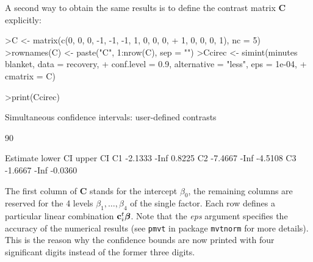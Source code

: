 \documentclass{article}
\newcommand{\bbeta}{\mbox{\boldmath $\beta$}}
\newcommand{\bc}{{\mathbf{c}}}
\newcommand{\bC}{{\mathbf{C}}}
\begin{document}
A second way to obtain the same results is to define the contrast
matrix $\bC$ explicitly:
\small
\begin{Schunk}
\begin{Sinput}
>C <- matrix(c(0, 0, 0, -1, -1, -1, 1, 0, 0, 0, 
+     1, 0, 0, 0, 1), nc = 5)
>rownames(C) <- paste("C", 1:nrow(C), sep = "")
>Ccirec <- simint(minutes ~ blanket, data = recovery, 
+     conf.level = 0.9, alternative = "less", eps = 1e-04, 
+     cmatrix = C)
\end{Sinput}
\end{Schunk}
\begin{Schunk}
\begin{Sinput}
>print(Ccirec)
\end{Sinput}
\begin{Soutput}
	Simultaneous confidence intervals: user-defined
	contrasts

	90 % confidence intervals

   Estimate lower CI upper CI
C1  -2.1333     -Inf   0.8225
C2  -7.4667     -Inf  -4.5108
C3  -1.6667     -Inf  -0.0360
\end{Soutput}
\end{Schunk}
\normalsize
The first column of $\bC$ stands for the intercept $\beta_0$, the
remaining columns are reserved for the 4 levels $\beta_1, \dots,
\beta_4$ of the single factor. Each row defines a particular
linear combination $\bc_i^t \bbeta$. Note that the {\em eps} argument
specifies the accuracy of the numerical results (see \texttt{pmvt} in package
\texttt{mvtnorm} for more details). This is the reason why
the confidence bounds are now printed with four significant digits 
instead of the former three digits.
\end{document}

